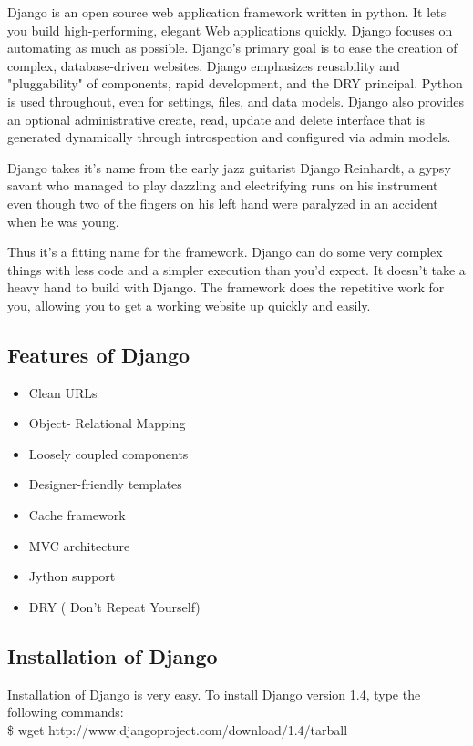 \noindent Django is an open source web application framework written in python. It lets 
you build high-performing, elegant Web applications quickly. Django 
focuses on automating as much as possible. Django's primary goal is to 
ease the creation of complex, database-driven websites. Django 
emphasizes reusability and "pluggability" of components, rapid 
development, and the DRY principal. Python is used throughout, even 
for settings, files, and data models. Django also provides an optional
 administrative create, read, update and delete interface that is 
generated dynamically through introspection and configured via admin 
models.

Django takes it's name from the early jazz guitarist Django Reinhardt, 
a gypsy savant who managed to play dazzling and electrifying runs on 
his instrument even though two of the fingers on his left hand were 
paralyzed in an accident when he was young.

Thus it’s a fitting name for the framework. Django can do some very 
complex things with less code and a simpler execution than you’d expect. 
It doesn't take a heavy hand to build with Django. The framework does 
the repetitive work for you, allowing you to get a working website up 
quickly and easily.
\subsection{Features of Django}
\begin{itemize}
\item Clean URLs
\item Object- Relational Mapping
\item Loosely coupled components
\item Designer-friendly templates  
\item Cache framework 
\item MVC architecture
\item Jython support
\item DRY ( Don't Repeat Yourself)
\end{itemize}
\subsection{Installation of Django}
Installation of Django is very easy. To install Django version 1.4,
type the following commands:\\

	\$ wget http://www.djangoproject.com/download/1.4/tarball\\


